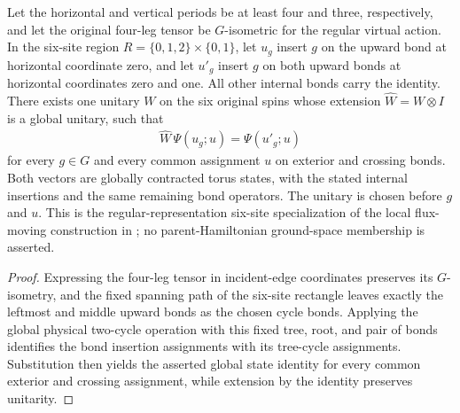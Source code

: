 \begin{lemma}%
    \label{thm:peps_torus_two_plaquette_global_flux_move}
    \leanok
    Let the horizontal and vertical periods be at least four and three,
    respectively, and let the original four-leg tensor be $G$-isometric for
    the regular virtual action. In the six-site region
    $R=\{0,1,2\}\times\{0,1\}$, let $u_g$ insert $g$ on the upward bond
    at horizontal coordinate zero, and let $u'_g$ insert $g$ on both upward
    bonds at horizontal coordinates zero and one. All other internal bonds
    carry the identity.
    There exists one unitary $W$ on the six original spins whose extension
    $\widehat W=W\otimes I$ is a global unitary, such that
    \begin{align}
        \widehat W\,\Psi(u_g;u)=\Psi(u'_g;u)
    \end{align}
    for every $g\in G$ and every common assignment $u$ on exterior and crossing
    bonds. Both vectors are globally contracted torus states, with
    the stated internal insertions and the same remaining bond operators.
    The unitary is chosen before $g$ and $u$.
    This is the regular-representation six-site specialization of the local
    flux-moving construction in \cite[Theorem~6.16]{Schuch2010PEPS}; no
    parent-Hamiltonian ground-space membership is asserted.
\end{lemma}

\begin{proof}\leanok
    Expressing the four-leg tensor in incident-edge coordinates preserves its
    $G$-isometry, and the fixed spanning path of the six-site rectangle
    leaves exactly the leftmost and middle upward bonds as the chosen cycle
    bonds. Applying the global physical two-cycle operation with this fixed
    tree, root, and pair of bonds identifies the bond insertion assignments
    with its tree-cycle assignments. Substitution then yields the asserted
    global state identity for every common exterior and crossing assignment,
    while extension by the identity preserves unitarity.
\end{proof}

